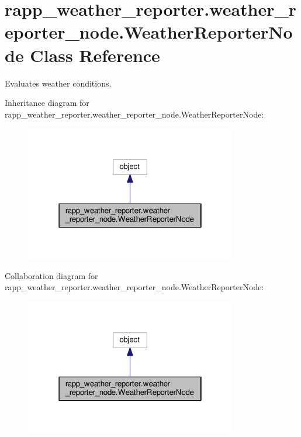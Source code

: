 \hypertarget{classrapp__weather__reporter_1_1weather__reporter__node_1_1WeatherReporterNode}{\section{rapp\-\_\-weather\-\_\-reporter.\-weather\-\_\-reporter\-\_\-node.\-Weather\-Reporter\-Node Class Reference}
\label{classrapp__weather__reporter_1_1weather__reporter__node_1_1WeatherReporterNode}
}


Evaluates weather conditions.  




Inheritance diagram for rapp\-\_\-weather\-\_\-reporter.\-weather\-\_\-reporter\-\_\-node.\-Weather\-Reporter\-Node\-:
\nopagebreak
\begin{figure}[H]
\begin{center}
\leavevmode
\includegraphics[width=262pt]{classrapp__weather__reporter_1_1weather__reporter__node_1_1WeatherReporterNode__inherit__graph}
\end{center}
\end{figure}


Collaboration diagram for rapp\-\_\-weather\-\_\-reporter.\-weather\-\_\-reporter\-\_\-node.\-Weather\-Reporter\-Node\-:
\nopagebreak
\begin{figure}[H]
\begin{center}
\leavevmode
\includegraphics[width=262pt]{classrapp__weather__reporter_1_1weather__reporter__node_1_1WeatherReporterNode__coll__graph}
\end{center}
\end{figure}
